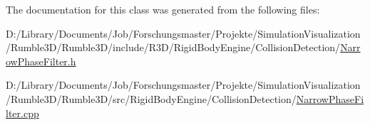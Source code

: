 The documentation for this class was generated from the following files\+:\begin{DoxyCompactItemize}
\item 
D\+:/\+Library/\+Documents/\+Job/\+Forschungsmaster/\+Projekte/\+Simulation\+Visualization/\+Rumble3\+D/\+Rumble3\+D/include/\+R3\+D/\+Rigid\+Body\+Engine/\+Collision\+Detection/\mbox{\hyperlink{_narrow_phase_filter_8h}{Narrow\+Phase\+Filter.\+h}}\item 
D\+:/\+Library/\+Documents/\+Job/\+Forschungsmaster/\+Projekte/\+Simulation\+Visualization/\+Rumble3\+D/\+Rumble3\+D/src/\+Rigid\+Body\+Engine/\+Collision\+Detection/\mbox{\hyperlink{_narrow_phase_filter_8cpp}{Narrow\+Phase\+Filter.\+cpp}}\end{DoxyCompactItemize}
